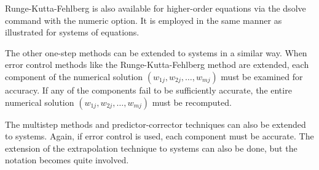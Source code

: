 %
%
%
Runge-Kutta-Fehlberg is also available for higher-order equations via the dsolve command with the numeric option. It is employed in the same manner as illustrated for systems of equations.

The other one-step methods can be extended to systems in a similar way. When error control methods like the Runge-Kutta-Fehlberg method are extended, each component of the numerical solution $\left(w_{1 j}, w_{2 j}, \ldots, w_{m j}\right)$ must be examined for accuracy. If any of the components fail to be sufficiently accurate, the entire numerical solution $\left(w_{1 j}, w_{2 j}, \ldots, w_{m j}\right)$ must be recomputed.

The multistep methods and predictor-corrector techniques can also be extended to systems. Again, if error control is used, each component must be accurate. The extension of the extrapolation technique to systems can also be done, but the notation becomes quite involved. 


